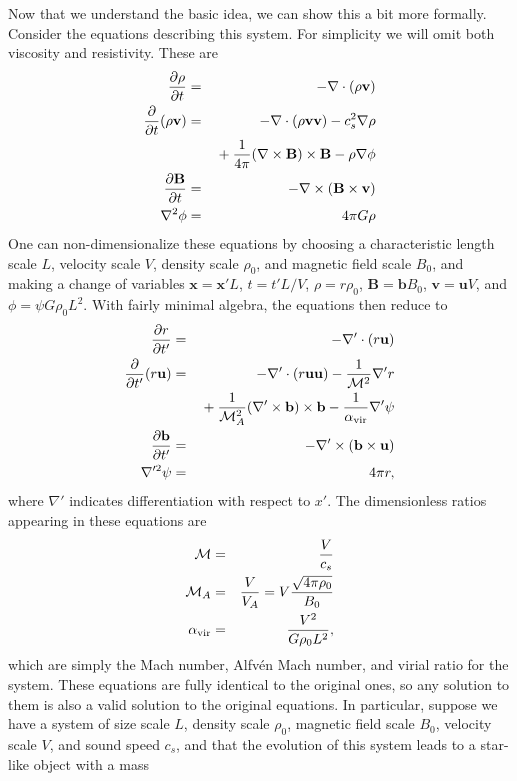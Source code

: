 Now that we understand the basic idea, we can show this a bit more formally. Consider the equations describing this system. For simplicity we will omit both viscosity and resistivity. These are
\begin{eqnarray}
\frac{\partial \rho}{\partial t} & = & -\nabla \cdot (\rho \mathbf{v}) \\
\frac{\partial}{\partial t}(\rho \mathbf{v}) & = & -\nabla \cdot (\rho\mathbf{v}\mathbf{v}) - c_s^2 \nabla \rho
\nonumber \\
& & {} + \frac{1}{4\pi} (\nabla \times \mathbf{B}) \times \mathbf{B} - \rho \nabla \phi \\
\frac{\partial\mathbf{B}}{\partial t} & = & -\nabla \times (\mathbf{B}\times\mathbf{v}) \\
\nabla^2 \phi & = & 4\pi G \rho
\end{eqnarray}
One can non-dimensionalize these equations by choosing a characteristic length scale $L$, velocity scale $V$, density scale $\rho_0$, and magnetic field scale $B_0$, and making a change of variables $\mathbf{x} = \mathbf{x}'L$, $t = t' L/V$, $\rho = r \rho_0$, $\mathbf{B} = \mathbf{b} B_0$, $\mathbf{v} = \mathbf{u} V$, and $\phi = \psi G\rho_0 L^2$. With fairly minimal algebra, the equations then reduce to
\begin{eqnarray}
\frac{\partial r}{\partial t'} & = & -\nabla'\cdot (r\mathbf{u}) \\
\frac{\partial}{\partial t'}(r \mathbf{u}) & = & -\nabla' \cdot \left(r\mathbf{uu}\right) - \frac{1}{\mathcal{M}^2}\nabla' r \nonumber \\
& & {} + \frac{1}{\mathcal{M}_A^2} (\nabla'\times\mathbf{b})\times\mathbf{b} - \frac{1}{\alpha_{\rm vir}} \nabla' \psi \\
\frac{\partial\mathbf{b}}{\partial t'} & = & -\nabla'\times\left(\mathbf{b}\times\mathbf{u}\right) \\
\nabla'^2 \psi & = & 4\pi r,
\end{eqnarray}
where $\nabla'$ indicates differentiation with respect to $x'$. The dimensionless ratios appearing in these equations are
\begin{eqnarray}
\mathcal{M} & = & \frac{V}{c_s} \\
\mathcal{M}_A & = & \frac{V}{V_A} = V\frac{\sqrt{4\pi \rho_0}}{B_0} \\
\alpha_{\rm vir} & = & \frac{V^2}{G \rho_0 L^2},
\end{eqnarray}
which are simply the Mach number, Alfv\'{e}n Mach number, and virial ratio for the system. These equations are fully identical to the original ones, so any solution to them is also a valid solution to the original equations. In particular, suppose we have a system of size scale $L$, density scale $\rho_0$, magnetic field scale $B_0$, velocity scale $V$, and sound speed $c_s$, and that the evolution of this system leads to a star-like object with a mass

